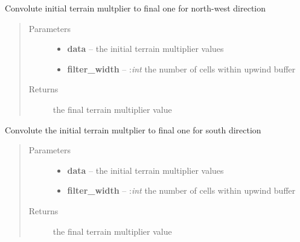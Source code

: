 \documentclass[letterpaper,10pt,english]{sphinxmanual}
\begin{document}

\begin{fulllineitems}
\label{docs/terrain:terrain_mult.convo_nw}
Convolute initial terrain multplier to final one for north-west direction
\begin{quote}\begin{description}
\item[{Parameters}] \leavevmode\begin{itemize}
\item {} 
\textbf{data} --  the initial terrain multiplier values

\item {} 
\textbf{filter\_width} -- :\emph{int} the number of cells within upwind buffer

\end{itemize}

\item[{Returns}] \leavevmode
{} the final terrain multiplier value

\end{description}\end{quote}

\end{fulllineitems}



\begin{fulllineitems}
\label{docs/terrain:terrain_mult.convo_s}
Convolute the initial terrain multplier to final one for south direction
\begin{quote}\begin{description}
\item[{Parameters}] \leavevmode\begin{itemize}
\item {} 
\textbf{data} --  the initial terrain multiplier values

\item {} 
\textbf{filter\_width} -- :\emph{int} the number of cells within upwind buffer

\end{itemize}

\item[{Returns}] \leavevmode
{} the final terrain multiplier value

\end{description}\end{quote}

\end{fulllineitems}
\end{document}
